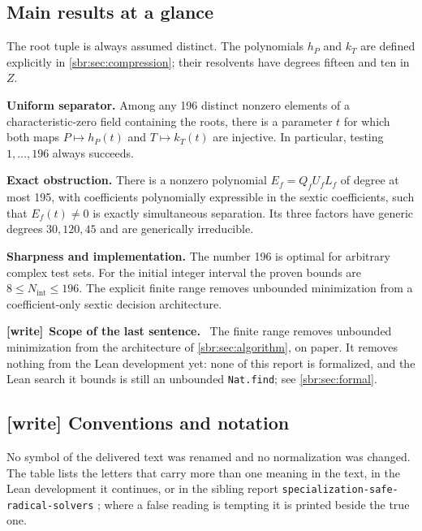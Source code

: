 \documentclass[11pt,letterpaper]{article}
\numberwithin{equation}{section}
\theoremstyle{definition}
\theoremstyle{remark}
\newcommand{\src}[1]{\texttt{\nolinkurl{#1}}}
\newenvironment{writenote}[1][]{\par\smallskip\begingroup\small
 \noindent\textbf{[write]}\if\relax\detokenize{#1}\relax\else~\textbf{#1.}\fi\ }%
 {\par\endgroup\smallskip}
\begin{document}
\subsection{Main results at a glance}

The root tuple is always assumed distinct. The polynomials $h_P$ and $k_T$
are defined explicitly in \cref{sbr:sec:compression}; their resolvents have degrees
fifteen and ten in $Z$.

\begin{resultbox}
\textbf{Uniform separator.} Among any 196 distinct nonzero elements of a
characteristic-zero field containing the roots, there is a parameter $t$
for which both maps $P\mapsto h_P(t)$ and $T\mapsto k_T(t)$ are injective.
In particular, testing $1,\ldots,196$ always succeeds.

\textbf{Exact obstruction.} There is a nonzero polynomial
$E_f=Q_fU_fL_f$ of degree at most 195, with coefficients polynomially
expressible in the sextic coefficients, such that $E_f(t)\ne0$ is exactly
simultaneous separation. Its three factors have generic degrees $30,120,45$
and are generically irreducible.

\textbf{Sharpness and implementation.} The number 196 is optimal for
arbitrary complex test sets. For the initial integer interval the proven
bounds are $8\le N_{\mathrm{int}}\le196$. The explicit finite range removes
unbounded minimization from a coefficient-only sextic decision architecture.
\end{resultbox}

\begin{writenote}[Scope of the last sentence]
The finite range removes unbounded minimization from the architecture of
\cref{sbr:sec:algorithm}, on paper. It removes nothing from the Lean
development yet: none of this report is formalized, and the Lean search it
bounds is still an unbounded \src{Nat.find}; see \cref{sbr:sec:formal}.
\end{writenote}

\subsection{[write] Conventions and notation}
\label{sbr:sec:notation}

No symbol of the delivered text was renamed and no normalization was
changed. The table lists the letters that carry more than one meaning in
the text, in the Lean development it continues, or in the sibling report
\src{specialization-safe-radical-solvers} \cite{rss}; where a false reading
is tempting it is printed beside the true one.
\end{document}
